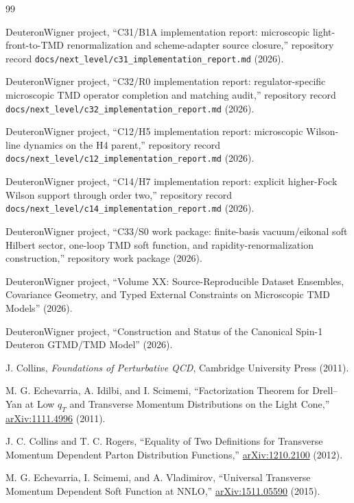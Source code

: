 \documentclass[11pt]{article}
\begin{document}
\begingroup
\raggedright
\begin{thebibliography}{99}

DeuteronWigner project,
``C31/B1A implementation report: microscopic light-front-to-TMD renormalization and scheme-adapter source closure,''
repository record \texttt{docs/next\_level/c31\_implementation\_report.md} (2026).

DeuteronWigner project,
``C32/R0 implementation report: regulator-specific microscopic TMD operator completion and matching audit,''
repository record \texttt{docs/next\_level/c32\_implementation\_report.md} (2026).

DeuteronWigner project,
``C12/H5 implementation report: microscopic Wilson-line dynamics on the H4 parent,''
repository record \texttt{docs/next\_level/c12\_implementation\_report.md} (2026).

DeuteronWigner project,
``C14/H7 implementation report: explicit higher-Fock Wilson support through order two,''
repository record \texttt{docs/next\_level/c14\_implementation\_report.md} (2026).

DeuteronWigner project,
``C33/S0 work package: finite-basis vacuum/eikonal soft Hilbert sector, one-loop TMD soft function, and rapidity-renormalization construction,''
repository work package (2026).

DeuteronWigner project,
``Volume XX: Source-Reproducible Dataset Ensembles, Covariance Geometry, and Typed External Constraints on Microscopic TMD Models'' (2026).

DeuteronWigner project,
``Construction and Status of the Canonical Spin-1 Deuteron GTMD/TMD Model'' (2026).

J. Collins,
\emph{Foundations of Perturbative QCD},
Cambridge University Press (2011).

M. G. Echevarria, A. Idilbi, and I. Scimemi,
``Factorization Theorem for Drell--Yan at Low \(q_T\) and Transverse Momentum Distributions on the Light Cone,''
\href{https://arxiv.org/abs/1111.4996}{arXiv:1111.4996} (2011).

J. C. Collins and T. C. Rogers,
``Equality of Two Definitions for Transverse Momentum Dependent Parton Distribution Functions,''
\href{https://arxiv.org/abs/1210.2100}{arXiv:1210.2100} (2012).

M. G. Echevarria, I. Scimemi, and A. Vladimirov,
``Universal Transverse Momentum Dependent Soft Function at NNLO,''
\href{https://arxiv.org/abs/1511.05590}{arXiv:1511.05590} (2015).


\end{thebibliography}
\end{document}
